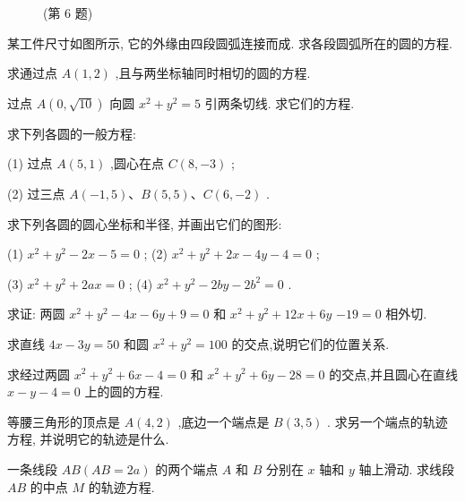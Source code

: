 \documentclass[lang=cn,newtx,12pt,scheme=chinese]{elegantbook}
\begin{document}
\begin{problemset}[习 题 五]
\begin{figure}[h]
  \centering
  
  \caption{(第 6 题)}
\end{figure}

\item 某工件尺寸如图所示, 它的外缘由四段圆弧连接而成. 求各段圆弧所在的圆的方程.

\item 求通过点 \(A\left( {1,2}\right)\) ,且与两坐标轴同时相切的圆的方程.

\item 过点 \(A\left( {0,\sqrt{10}}\right)\) 向圆 \({x}^{2} + {y}^{2} = 5\) 引两条切线. 求它们的方程.

\item 求下列各圆的一般方程:

(1) 过点 \(A\left( {5,1}\right)\) ,圆心在点 \(C\left( {8, - 3}\right)\) ;

(2) 过三点 \(A\left( {-1,5}\right) \text{、}B\left( {5,5}\right) \text{、}C\left( {6, - 2}\right)\) .

\item 求下列各圆的圆心坐标和半径, 并画出它们的图形:

(1) \({x}^{2} + {y}^{2} - {2x} - 5 = 0\) ; (2) \({x}^{2} + {y}^{2} + {2x} - {4y} - 4 = 0\) ;

(3) \({x}^{2} + {y}^{2} + {2ax} = 0\) ; (4) \({x}^{2} + {y}^{2} - {2by} - 2{b}^{2} = 0\) .

\item 求证: 两圆 \({x}^{2} + {y}^{2} - {4x} - {6y} + 9 = 0\) 和 \({x}^{2} + {y}^{2} + {12x} + {6y}\) \(- {19} = 0\) 相外切.

\item 求直线 \({4x} - {3y} = {50}\) 和圆 \({x}^{2} + {y}^{2} = {100}\) 的交点,说明它们的位置关系.

\item 求经过两圆 \({x}^{2} + {y}^{2} + {6x} - 4 = 0\) 和 \({x}^{2} + {y}^{2} + {6y} - {28} = 0\) 的交点,并且圆心在直线 \(x - y - 4 = 0\) 上的圆的方程.

\item 等腰三角形的顶点是 \(A\left( {4,2}\right)\) ,底边一个端点是 \(B\left( {3,5}\right)\) . 求另一个端点的轨迹方程, 并说明它的轨迹是什么.

\item 一条线段 \({AB}\left( {{AB} = {2a}}\right)\) 的两个端点 \(A\) 和 \(B\) 分别在 \(x\) 轴和 \(y\) 轴上滑动. 求线段 \({AB}\) 的中点 \(M\) 的轨迹方程.
\end{problemset}
\end{document}
